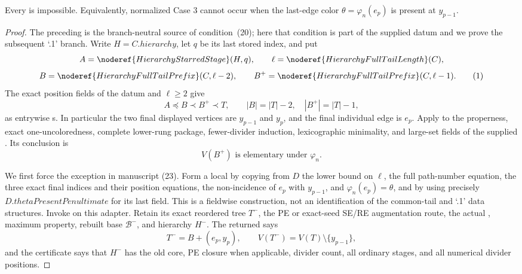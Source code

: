 \begin{lemma}
Every  is impossible.
Equivalently, normalized Case 3 cannot occur when the last-edge color
\(\theta=\varphi_n(e_p)\) is present at \(y_{p-1}\).
\end{lemma}
\begin{proof}
The preceding 
is the branch-neutral source of condition~(20); here that condition is
part of the supplied datum and we prove the subsequent `.1' branch.
Write \(H=C.\mathit{hierarchy}\), let \(q\) be its last stored index, and
put
\[
 A=\noderef{HierarchyStarredStage}(H,q),\qquad
 \ell=\noderef{HierarchyFullTailLength}(C),
\]
\[
 B=\noderef{HierarchyFullTailPrefix}(C,\ell-2),\qquad
 B^+=\noderef{HierarchyFullTailPrefix}(C,\ell-1).
                                                               \tag{1}
\]
The exact position fields of the datum and \(\ell\geq2\) give
\[
 A\preccurlyeq B\prec B^+\prec T,\qquad
 |B|=|T|-2,\quad |B^+|=|T|-1,                                \tag{2}
\]
as entrywise s.  In particular the
two final displayed vertices are \(y_{p-1}\) and \(y_p\), and the final
individual edge is \(e_p\).  Apply
 to the properness,
exact one-uncoloredness, complete lower-rung package, fewer-divider
induction, lexicographic minimality, and large-set fields of the supplied
.  Its conclusion is
\[
             V(B^+)\text{ is elementary under }\varphi_n.    \tag{3}
\]

We first force the exception in manuscript (23).  Form a local
 by copying from \(D\) the lower
bound on \(\ell\), the full path-number equation, the three exact final
indices and their position equations, the non-incidence of \(e_p\) with
\(y_{p-1}\), and \(\varphi_n(e_p)=\theta\), and by using precisely
\(D.\mathit{thetaPresentPenultimate}\) for its last field.  This is a
fieldwise construction, not an identification of the common-tail and
`.1' data structures.  Invoke
 on this adapter.
Retain its exact reordered tree \(T^-\), the PE or exact-seed SE/RE
augmentation route, the actual
, maximum property, rebuilt
base \(\mathcal B^-\), and hierarchy \(H^-\).  The returned
 says
\[
       T^-=B+(e_p,y_p),\qquad
       V(T^-)=V(T)\setminus\{y_{p-1}\},                     \tag{4}
\]
and the certificate says that \(H^-\) has the old core, PE closure when
applicable, divider count, all ordinary stages, and all numerical divider
positions.


\end{proof}
